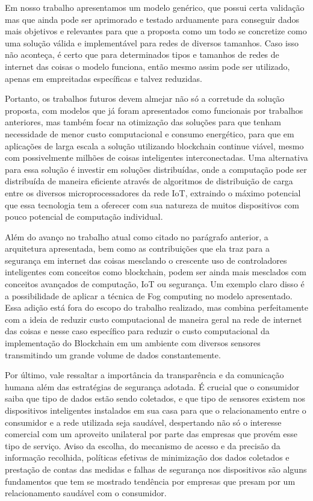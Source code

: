 Em nosso trabalho apresentamos um modelo genérico, que possui certa validação mas que ainda pode ser aprimorado e testado arduamente para conseguir dados mais objetivos e relevantes para que a proposta como um todo se concretize como uma solução válida e implementável para redes de diversos tamanhos. Caso isso não aconteça, é certo que para determinados tipos e tamanhos de redes de internet das coisas o modelo funciona, então mesmo assim pode ser utilizado, apenas em empreitadas específicas e talvez reduzidas.

Portanto, os trabalhos futuros devem almejar não só a corretude da solução proposta, com modelos que já foram apresentados como funcionais por trabalhos anteriores, mas também focar na otimização das soluções para que tenham necessidade de menor custo computacional e consumo energético, para que em aplicações de larga escala a solução utilizando blockchain continue viável, mesmo com possivelmente milhões de coisas inteligentes interconectadas. Uma alternativa para essa solução é investir em soluções distribuídas, onde a computação pode ser distribuída de maneira eficiente através de algoritmos de distribuição de carga entre os diversos microprocessadores da rede IoT, extraindo o máximo potencial que essa tecnologia tem a oferecer com sua natureza de muitos dispositivos com pouco potencial de computação individual.

Além do avanço no trabalho atual como citado no parágrafo anterior, a arquitetura apresentada, bem como as contribuições que ela traz para a segurança em internet das coisas mesclando o crescente uso de controladores inteligentes com conceitos como blockchain, podem ser ainda mais mesclados com conceitos avançados de computação, IoT ou segurança. Um exemplo claro disso é a possibilidade de aplicar a técnica de Fog computing no modelo apresentado. Essa adição está fora do escopo do trabalho realizado, mas combina perfeitamente com a ideia de reduzir custo computacional de maneira geral na rede de internet das coisas e nesse caso específico para reduzir o custo computacional da implementação do Blockchain em um ambiente com diversos sensores transmitindo um grande volume de dados constantemente.

Por último, vale ressaltar a importância da transparência e da comunicação humana além das estratégias de segurança adotada. É crucial que o consumidor saiba que tipo de dados estão sendo coletados, e que tipo de sensores existem nos dispositivos inteligentes instalados em sua casa para que o relacionamento entre o consumidor e a rede utilizada seja saudável, despertando não só o interesse comercial com um aproveito unilateral por parte das empresas que provém esse tipo de serviço. Aviso da escolha, do mecanismo de acesso e da precisão da informação recolhida, políticas efetivas de minimização dos dados coletados e prestação de contas das medidas e falhas de segurança nos dispositivos são alguns fundamentos que tem se mostrado tendência por empresas que presam por um relacionamento saudável com o consumidor.
